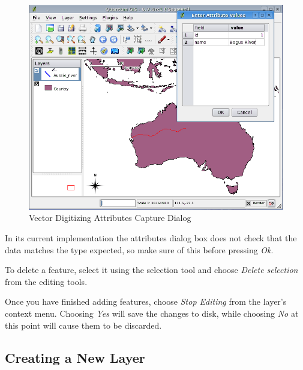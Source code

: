 \begin{figure}[h]
   \begin{center}
   \caption{Vector Digitizing Attributes Capture Dialog}\label{fig:vector_digitising}\smallskip
   \includegraphics[scale=.65]{qgis_user_guide_images/digitising_attributes}
\end{center}  
\end{figure}

In its current implementation the attributes dialog box does not check that the
data matches the type expected, so make sure of this before
pressing \textit{Ok}. 

To delete a feature, select it using the selection tool and choose
\textit{Delete selection} from the editing tools.

Once you have finished adding features, choose \textit{Stop Editing} from the
layer's context menu. Choosing \textit{Yes} will save the changes to disk, while
choosing \textit{No} at this point will cause them to be discarded.

\subsection{Creating a New Layer}

